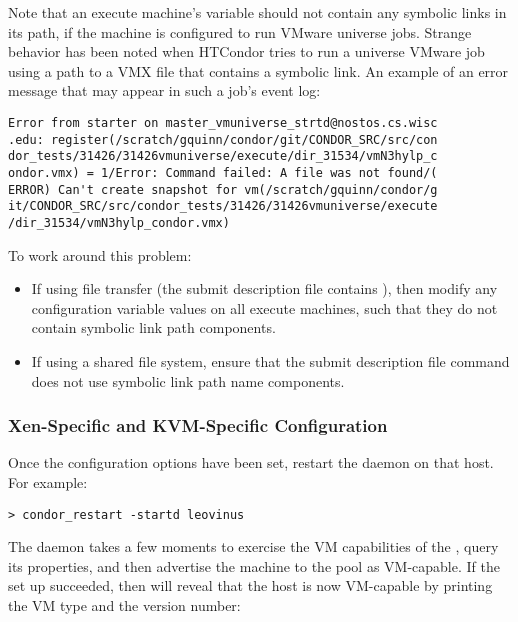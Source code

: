Note that an execute machine's  variable should not
contain any symbolic links in its path,
if the machine is configured to run VMware  universe jobs.
Strange behavior has been noted when HTCondor tries to run a 
 universe VMware
job using a path to a VMX file that contains a symbolic link.
An example of an error message that may appear in such a job's event log:
\begin{verbatim}
Error from starter on master_vmuniverse_strtd@nostos.cs.wisc
.edu: register(/scratch/gquinn/condor/git/CONDOR_SRC/src/con
dor_tests/31426/31426vmuniverse/execute/dir_31534/vmN3hylp_c
ondor.vmx) = 1/Error: Command failed: A file was not found/(
ERROR) Can't create snapshot for vm(/scratch/gquinn/condor/g
it/CONDOR_SRC/src/condor_tests/31426/31426vmuniverse/execute
/dir_31534/vmN3hylp_condor.vmx)
\end{verbatim}
To work around this problem:
\begin{itemize}
\item If using file transfer
(the submit description file contains
),
then modify any
configuration variable  values on all execute machines,
such that they do not contain symbolic link path components.
\item If using a shared file system, ensure that the
submit description file command
 does not use
symbolic link path name components.
\end{itemize}


\subsubsection{Xen-Specific and KVM-Specific Configuration}

Once the configuration options have been set, restart the  
daemon on that host.  For example:

\begin{verbatim}
> condor_restart -startd leovinus
\end{verbatim}

The  daemon takes a few moments to exercise the VM
capabilities of the , query its properties, and then 
advertise the machine to the pool as VM-capable.
If the set up succeeded,
 then  will reveal that the host is now 
VM-capable by printing the VM type and the version number:

